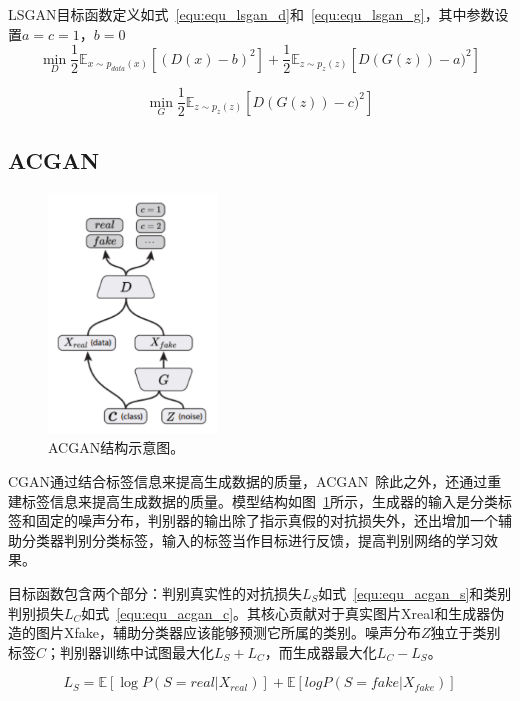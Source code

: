 LSGAN目标函数定义如式~\ref{equ:equ_lsgan_d}和~\ref{equ:equ_lsgan_g}，其中参数设置$a=c=1$，$b=0$
\begin{equation}
\label{equ:equ_lsgan_d}
\min \limits_D \frac{1}{2} \mathbb{E}_{x \sim p_{data}(x)}[(D(x)-b)^2] + \frac{1}{2} \mathbb{E}_{z \sim{p_z(z)}}[D(G(z))-a)^2]
\end{equation}

\begin{equation}
\label{equ:equ_lsgan_g}
\min \limits_G\frac{1}{2}\mathbb{E}_{z \sim{p_z(z)}}[D(G(z))-c)^2]
\end{equation}


\subsection{ACGAN}
\begin{figure}[ht]
    \centering
	\includegraphics[width=0.4\textwidth]{figs/acgan.pdf}
	\caption{ACGAN结构示意图。}
	\label{fig:pic_acgan}
\end{figure}

CGAN通过结合标签信息来提高生成数据的质量，ACGAN~\cite{odena2017conditional}除此之外，还通过重建标签信息来提高生成数据的质量。模型结构如图~\ref{fig:pic_acgan}所示，生成器的输入是分类标签和固定的噪声分布，判别器的输出除了指示真假的对抗损失外，还出增加一个辅助分类器判别分类标签，输入的标签当作目标进行反馈，提高判别网络的学习效果。

目标函数包含两个部分：判别真实性的对抗损失$L_S$如式~\ref{equ:equ_acgan_s}和类别判别损失$L_C$如式~\ref{equ:equ_acgan_c}。其核心贡献对于真实图片Xreal和生成器伪造的图片Xfake，辅助分类器应该能够预测它所属的类别。噪声分布$Z$独立于类别标签$C$；判别器训练中试图最大化$L_S+L_C$，而生成器最大化$L_C-L_S$。

\begin{equation}
\label{equ:equ_acgan_s}
L_S = \mathbb{E}[\log P(S = real | X_{real})] + \mathbb{E}[logP(S = fake | X_{fake})]
\end{equation}

